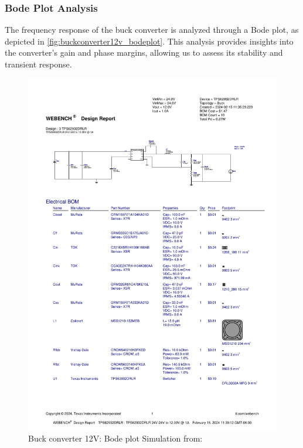 \subsubsection{Bode Plot Analysis}
The frequency response of the buck converter is analyzed through a Bode plot, as depicted in \autoref{fig:buckconverter12v_bodeplot}. This analysis provides insights into the converter's gain and phase margins, allowing us to assess its stability and transient response.
\begin{figure}[H]
    \centering
    \includegraphics[trim=0 165 0 70,clip,width=0.8\linewidth,page=8]{img//buckconverters//12v/WBDesign3_Bode Plot.pdf}
    \caption{Buck converter 12V: Bode plot Simulation from: %
    }
    \label{fig:buckconverter12v_bodeplot}
\end{figure}

